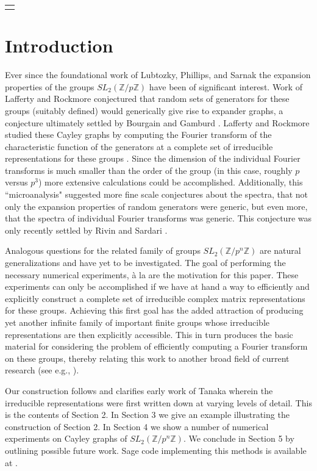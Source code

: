 \documentclass[12pt,reqno]{amsart}
\theoremstyle{remark}
\numberwithin{table}{section}
\newcommand{\Z}{\mathbb Z}
\begin{document}
\null\hfill\begin{tabular}[t]{l@{}}
\text{} \\
\end{tabular}



\section{Introduction}

Ever since the foundational work of Lubtozky, Phillips, and Sarnak \cite{LPS} the expansion properties of the groups $SL_2(\Z /p \Z)$ have been of significant interest. Work of Lafferty and Rockmore \cite{LR92,LR93}  conjectured that random sets of generators for these groups (suitably defined) would generically give rise to expander graphs, a conjecture ultimately settled by Bourgain and Gamburd \cite{BG}. Lafferty and Rockmore studied these Cayley graphs by computing the Fourier transform of the characteristic function of the generators at a complete set of irreducible representations for these groups \cite{LR99}. Since the dimension of the individual Fourier transforms is much smaller than the order of the group (in this case, roughly $p$ versus $p^3$) more extensive calculations could be accomplished. Additionally, this ``microanalysis" suggested more fine scale conjectures about the spectra, that  not only  the expansion properties of random generators were generic, but even more, that the spectra of individual Fourier transforms was generic. This conjecture was only recently settled by Rivin and Sardari \cite{RS}. 

Analogous questions for the related family of groups $SL_2(\Z/p^n \Z)$ are natural generalizations and have yet to be investigated. The goal of performing the necessary numerical experiments, \`{a} la \cite{LR92,LR93,LR99} are the motivation for this paper. These experiments can only be accomplished if we have at hand a way to efficiently and explicitly construct a complete set of irreducible complex matrix representations for these groups. Achieving this first goal has the added attraction of producing yet another infinite family of important finite groups whose irreducible representations are then explicitly accessible. This in turn produces the basic material for considering the problem of efficiently computing a Fourier transform on these groups, thereby relating this work to another broad field of current research (see e.g., \cite{MaslenRockmoreNotices,sovII}). 

Our construction follows and clarifies early work of Tanaka \cite{Tanaka67-2,Tanaka67-1} wherein the irreducible representations were first written down at varying levels of detail. This is the contents of Section 2. In Section 3 we give an example illustrating the construction of Section 2. In Section 4 we show a number of numerical experiments on Cayley graphs of $SL_2(\Z/p^n \Z)$. We conclude in Section 5 by outlining possible future work. Sage code implementing this methods is available at \cite{GH_Code}.
\end{document}
